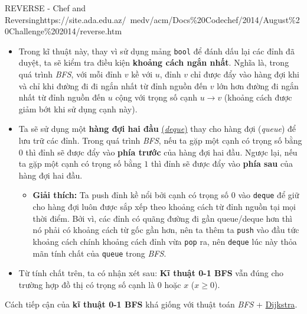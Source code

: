 \begin{baitap}{REVERSE - Chef and Reversing}{https://site.ada.edu.az/~medv/acm/Docs\%20Codechef/2014/August\%20Challenge\%202014/reverse.htm}
\begin{itemize}
    \item Trong kĩ thuật này, thay vì sử dụng mảng \texttt{bool} để đánh dấu lại các đỉnh đã duyệt, ta sẽ kiểm tra điều kiện \textbf{khoảng cách ngắn nhất}. Nghĩa là, trong quá trình \textit{BFS}, với mỗi đỉnh $v$ kề với $u$, đỉnh $v$ chỉ được đẩy vào hàng đợi khi và chỉ khi đường đi đi ngắn nhất từ đỉnh nguồn đến $v$ lớn hơn đường đi ngắn nhất từ đỉnh nguồn đến $u$ cộng với trọng số cạnh $u \rightarrow v$ (khoảng cách được giảm bớt khi sử dụng cạnh này).
    \item Ta sẽ sử dụng một \textbf{hàng đợi hai đầu} \href{https://wiki.vnoi.info/algo/data-structures/Deque}{(\textit{deque})} thay cho hàng đợi (\textit{queue}) để lưu trữ các đỉnh. Trong quá trình \textit{BFS}, nếu ta gặp một cạnh có trọng số bằng $0$ thì đỉnh sẽ được đẩy vào \textbf{phía trước} của hàng đợi hai đầu. Ngược lại, nếu ta gặp một cạnh có trọng số bằng $1$ thì đỉnh sẽ được đẩy vào \textbf{phía sau} của hàng đợi hai đầu.
    \begin{itemize}
        \item \textbf{Giải thích:} Ta push đỉnh kề nổi bởi cạnh có trọng số $0$ vào \texttt{deque} để giữ cho hàng đợi luôn được sắp xếp theo khoảng cách từ đỉnh nguồn tại mọi thời điểm. Bởi vì, các đỉnh có quãng đường đi gần queue/deque hơn thì nó phải có khoảng cách từ gốc gần hơn, nên ta thêm ta \texttt{push} vào đầu tức khoảng cách chính khoảng cách đỉnh vừa \texttt{pop} ra, nên \texttt{deque} lúc này thỏa mãn tính chất của \texttt{queue} trong \textit{BFS}.
    \end{itemize}
    \item Từ tính chất trên, ta có nhận xét sau: \textbf{Kĩ thuật 0-1 BFS} vẫn đúng cho trường hợp đồ thị có trọng số cạnh là $0$ hoặc $x$ ($x \geq 0$).
\end{itemize}

Cách tiếp cận của \textbf{kĩ thuật 0-1 BFS} khá giống với thuật toán \textit{BFS} + \href{https://en.wikipedia.org/wiki/Dijkstra%27s_algorithm}{Dijkstra}.

\end{baitap}

